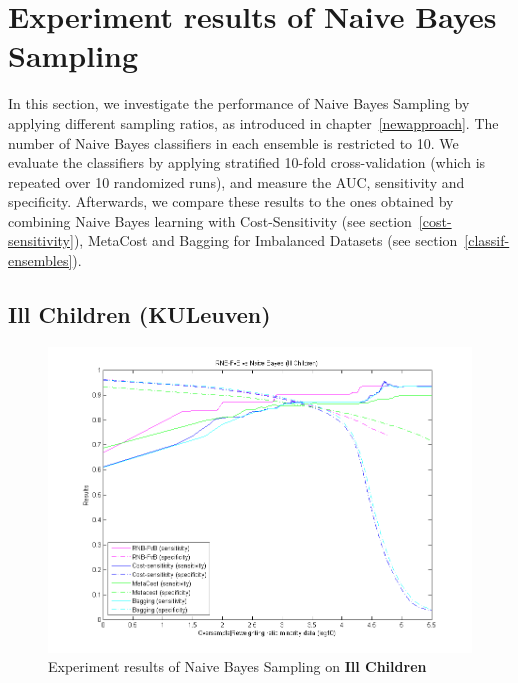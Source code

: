 \newpage
\section{Experiment results of Naive Bayes Sampling}\label{exp-rnb}
In this section, we investigate the performance of Naive Bayes Sampling by applying different sampling ratios, as introduced in chapter~\ref{newapproach}. The number of Naive Bayes classifiers in each ensemble is restricted to 10. 
We evaluate the classifiers by applying stratified 10-fold cross-validation (which is repeated over 10 randomized runs), and measure the AUC, sensitivity and specificity. Afterwards, we compare these results to the ones obtained by combining Naive Bayes learning with Cost-Sensitivity (see section~\ref{cost-sensitivity}), MetaCost and Bagging for Imbalanced Datasets (see section~\ref{classif-ensembles}).

\newpage
\subsection{Ill Children (KULeuven)}
\begin{figure}[h]
\includegraphics[scale=0.65]{img/RNB-FvB-illchildren.png}
\caption{Experiment results of Naive Bayes Sampling on \textbf{Ill Children}}
\end{figure}
 

